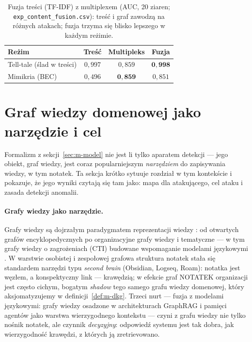 \begin{table}[htbp]\centering
\begin{tabular}{lccc}
\toprule
Reżim & Treść & Multipleks & Fuzja \\
\midrule
Tell-tale (ślad w treści) & $0{,}997$ & $0{,}859$ & $\mathbf{0{,}998}$ \\
Mimikria (BEC)            & $0{,}496$ & $\mathbf{0{,}859}$ & $0{,}851$ \\
\bottomrule
\end{tabular}
\caption{Fuzja treści (TF-IDF) z multiplexem (AUC, 20 ziaren;
\texttt{exp\_content\_fusion.csv}): treść i graf zawodzą na
różnych atakach; fuzja trzyma się blisko lepszego w każdym
reżimie.}
\label{tab:m-tresc}
\end{table}

\section{Graf wiedzy domenowej jako narzędzie i cel}
\label{sec:m-kg}

Formalizm z sekcji~\ref{sec:m-model} nie jest li tylko aparatem
detekcji --- jego obiekt, graf wiedzy, jest coraz popularniejszym
\emph{narzędziem} do zapisywania wiedzy, w tym notatek. Ta sekcja
krótko sytuuje rozdział w tym kontekście i pokazuje, że jego
wyniki czytają się tam jako: mapa dla atakującego, cel ataku
i zasada detekcji anomalii.

\paragraph{Grafy wiedzy jako narzędzie.} Grafy wiedzy są
dojrzałym paradygmatem reprezentacji wiedzy \citep{hogan2021knowledge,
ji2022survey}: od otwartych grafów encyklopedycznych po
organizacyjne grafy wiedzy i tematyczne --- w tym grafy wiedzy
o zagrożeniach (CTI) budowane wspomaganie modelami językowymi
\citep{fieblinger2024actionable,cheng2024ctinexus}. W warstwie
osobistej i zespołowej grafowa struktura notatek stała się
standardem narzędzi typu \emph{second brain} (Obsidian, Logseq,
Roam): notatka jest węzłem, a konspektyczny link --- krawędzią;
w efekcie graf NOTATEK organizacji jest często cichym, bogatym
\emph{shadow} tego samego grafu wiedzy domenowej, który
aksjomatyzujemy w definicji~\ref{def:m-dkg}. Trzeci nurt ---
fuzja z modelami językowymi: grafy wiedzy osadzone w
architekturach GraphRAG i pamięci agentów jako warstwa
wierzygodnego kontekstu \citep{pan2024roadmap,edge2024graphrag}
--- czyni z grafu wiedzy nie tylko nośnik notatek, ale czynnik
\emph{decyzyjny}: odpowiedź systemu jest tak dobra, jak
wierzygodność krawędzi, z których ją zretrievowano.

